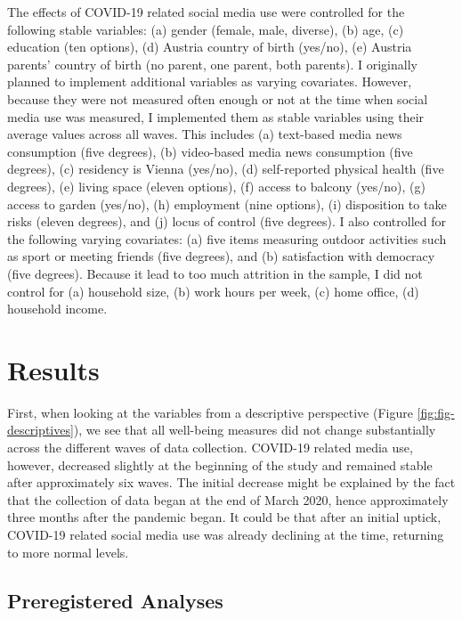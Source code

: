\documentclass[
  man,mask]{apa7}
\begin{document}
The effects of COVID-19 related social media use were controlled for the following stable variables:
(a) gender (female, male, diverse), (b) age, (c) education (ten options), (d) Austria country of birth (yes/no), (e) Austria parents' country of birth (no parent, one parent, both parents).
I originally planned to implement additional variables as varying covariates.
However, because they were not measured often enough or not at the time when social media use was measured, I implemented them as stable variables using their average values across all waves.
This includes (a) text-based media news consumption (five degrees), (b) video-based media news consumption (five degrees), (c) residency is Vienna (yes/no), (d) self-reported physical health (five degrees), (e) living space (eleven options), (f) access to balcony (yes/no), (g) access to garden (yes/no), (h) employment (nine options), (i) disposition to take risks (eleven degrees), and (j) locus of control (five degrees).
I also controlled for the following varying covariates: (a) five items measuring outdoor activities such as sport or meeting friends (five degrees), and (b) satisfaction with democracy (five degrees).
Because it lead to too much attrition in the sample, I did not control for (a) household size, (b) work hours per week, (c) home office, (d) household income.

\hypertarget{results}{%
\section{Results}\label{results}}

First, when looking at the variables from a descriptive perspective (Figure \ref{fig:fig-descriptives}), we see that all well-being measures did not change substantially across the different waves of data collection.
COVID-19 related media use, however, decreased slightly at the beginning of the study and remained stable after approximately six waves.
The initial decrease might be explained by the fact that the collection of data began at the end of March 2020, hence approximately three months after the pandemic began.
It could be that after an initial uptick, COVID-19 related social media use was already declining at the time, returning to more normal levels.

\hypertarget{preregistered-analyses}{%
\subsection{Preregistered Analyses}\label{preregistered-analyses}}
\end{document}
